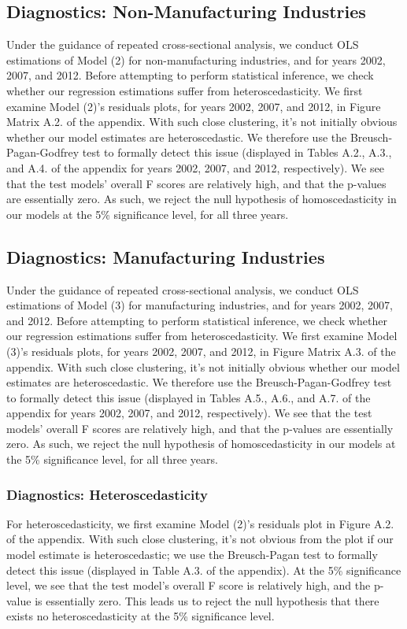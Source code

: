 \subsection{Diagnostics: Non-Manufacturing Industries}

Under the guidance of repeated cross-sectional analysis, we conduct OLS estimations of Model (2) for non-manufacturing industries, and for years 2002, 2007, and 2012. Before attempting to perform statistical inference, we check whether our regression estimations suffer from heteroscedasticity. We first examine Model (2)'s residuals plots, for years 2002, 2007, and 2012, in Figure Matrix A.2. of the appendix. With such close clustering, it’s not initially obvious whether our model estimates are heteroscedastic. We therefore use the Breusch-Pagan-Godfrey test to formally detect this issue (displayed in Tables A.2., A.3., and A.4. of the appendix for years 2002, 2007, and 2012, respectively). We see that the test models' overall F scores are relatively high, and that the p-values are essentially zero. As such, we reject the null hypothesis of homoscedasticity in our models at the 5\% significance level, for all three years. \\

\subsection{Diagnostics: Manufacturing Industries}
Under the guidance of repeated cross-sectional analysis, we conduct OLS estimations of Model (3) for manufacturing industries, and for years 2002, 2007, and 2012. Before attempting to perform statistical inference, we check whether our regression estimations suffer from heteroscedasticity. We first examine Model (3)'s residuals plots, for years 2002, 2007, and 2012, in Figure Matrix A.3. of the appendix. With such close clustering, it's not initially obvious whether our model estimates are heteroscedastic. We therefore use the Breusch-Pagan-Godfrey test to formally detect this issue (displayed in Tables A.5., A.6., and A.7. of the appendix for years 2002, 2007, and 2012, respectively). We see that the test models' overall F scores are relatively high, and that the p-values are essentially zero. As such, we reject the null hypothesis of homoscedasticity in our models at the 5\% significance level, for all three years.

\iffalse
\subsubsection{Diagnostics: Heteroscedasticity}
For heteroscedasticity, we first examine Model (2)'s residuals plot in Figure A.2. of the appendix. With such close clustering, it’s not obvious from the plot if our model estimate is heteroscedastic; we use the Breusch-Pagan test to formally detect this issue (displayed in Table A.3. of the appendix). At the 5\% significance level, we see that the test model’s overall F score is relatively high, and the p-value is essentially zero. This leads us to reject the null hypothesis that there exists no heteroscedasticity at the 5\% significance level. \\

